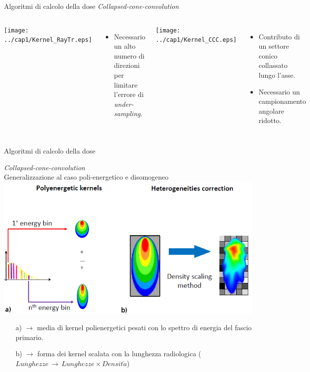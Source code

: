 \documentclass{beamer}
\begin{document}
\begin{frame}{Algoritmi di calcolo della dose}
\small
\centering
\alert{\textit{Collapsed-cone-convolution}}\\\vspace{.3cm}
\begin{columns}[t]
\centering
\texttt{[image: ../cap1/Kernel\_RayTr.eps]}\\\vspace{.5cm}
\scriptsize
{}
\begin{itemize}
\scriptsize
\item Necessario un alto numero di direzioni per limitare l'errore di \textit{under-sampling}.
\end{itemize}

\centering
\texttt{[image: ../cap1/Kernel\_CCC.eps]}\\\vspace{.5cm}
\scriptsize
{}
\begin{itemize}
\scriptsize
\item Contributo di un settore conico collassato lungo l'asse.
\item Necessario un campionamento angolare ridotto.
\end{itemize}
\end{columns}
\end{frame}



\begin{frame}[t]{Algoritmi di calcolo della dose}
\small
{\centering
\alert{\textit{Collapsed-cone-convolution}\\
\footnotesize Generalizzazione al caso poli-energetico e disomogeneo} \\ \vspace{.5cm}
\includegraphics[width=.7\textwidth]{../cap1/kern_trans.png}\\
\scriptsize
\begin{itemize}
\item[a)]  $\rightarrow$ media di kernel polienergetici pesati con lo spettro di energia del fascio primario.
\item[b)]  $\rightarrow$ forma dei kernel scalata con la lunghezza radiologica ($Lunghezze\,\rightarrow\,Lunghezze \times Densit\grave{a}$)
\end{itemize}
}
\end{frame}
\end{document}

